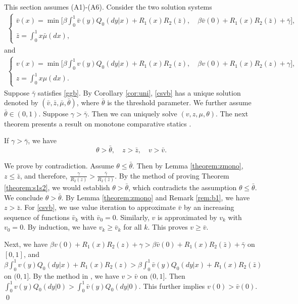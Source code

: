 \documentclass[graybox]{svmult}
\begin{document}
This section assumes (A1)-(A6).
Consider the two solution systems
\begin{align}\label{csvb}
\begin{cases}
\displaystyle
\bar v(x) =  \min \Big[\beta \int_0^1 \bar v( y) Q_0(dy|x) + R_1(x)R_2( \bar z),
\quad \beta \bar v(0) + R_1(x)R_2( \bar z)+ \bar \gamma\Big],\\
\displaystyle
\bar z=\int_0^1 x\bar  \mu(dx),
\end{cases}
\end{align}
and
\begin{align}\label{csv}
\begin{cases}
\displaystyle
v(x) =  \min \Big[\beta \int_0^1 v( y) Q_0(dy|x) + R_1(x)R_2(  z),
\quad \beta v(0) + R_1(x)R_2( z)+ \gamma\Big],\\
\displaystyle
z=\int_0^1 x \mu(dx).
\end{cases}
\end{align}
Suppose $\bar \gamma$ satisfies \eqref{ggb}.
By Corollary \ref{cor:uni}, \eqref{csvb} has a unique solution denoted by $(\bar v, \bar z,\bar \mu, \bar \theta)$, where $\bar\theta$ is  the threshold parameter. We further assume
$\bar \theta\in (0, 1)$.  Suppose $\gamma>\bar \gamma$.  Then we can uniquely solve $(v, z,\mu, \theta  )$. The next theorem presents a result on monotone comparative statics \cite{T98}.
\begin{theorem} \label{theorem:mcs}
If $\gamma >\bar \gamma$,
we have
$$
\theta >\bar \theta, \quad z >\bar z, \quad  v>\bar v.
$$
\end{theorem}
\proof We prove by contradiction. Assume $\theta\le \bar \theta$. Then by Lemma \ref{theorem:zmono}, $z\le \bar z$, and therefore, $ \frac{\gamma}{R_2(z)} >\frac{\bar \gamma}{R_2(\bar z)}$. By the method of proving  Theorem
\ref{theorem:s1s2}, we would establish $\theta>\bar \theta$, which contradicts the assumption $\theta\le \bar \theta$. We conclude $ \theta> \bar \theta$. By Lemma \ref{theorem:zmono} and Remark \ref{rem:b1}, we have $z> \bar z$.
For \eqref{csvb}, we use value iteration to approximate $\bar v$ by an increasing sequence of functions $\bar v_k$ with $\bar v_0=0$. Similarly, $v$ is approximated by $v_k$ with $v_0=0$. By induction, we have $ v_k\ge \bar v_k$ for all $k$. This proves $ v\ge \bar v$.

Next, we have $\beta  v(0) + R_1(x)R_2(  z)+  \gamma>
\beta \bar v(0) + R_1(x)R_2( \bar z)+ \bar \gamma$ on $[0,1]$, and
$\beta \int_0^1  v( y) Q_0(dy|x) + R_1(x)R_2(  z) >\beta \int_0^1 \bar v( y) Q_0(dy|x) + R_1(x)R_2( \bar z)$ on $(0, 1]$. By the method in \cite[Lemma 2]{HM16Chen}, we have
$v>\bar v$ on $(0, 1]$. Then $\int_0^1  v( y) Q_0(dy|0)> \int_0^1  \bar v( y) Q_0(dy|0)$. This further implies $v(0)>\bar v(0)$.
 \qed
\end{document}
